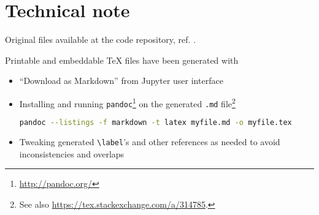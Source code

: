 \section*{Technical note}

Original files available at
the code repository, ref. \cite{OwnJupyterRepo}.

Printable and embeddable \TeX{} files have been generated with
\begin{itemize}
  \item
    ``Download as Markdown'' from Jupyter user interface
  \item
    Installing and running \verb#pandoc#\footnote{ \url{http://pandoc.org/}}
    on the generated \verb#.md# file\footnote{ See also \url{https://tex.stackexchange.com/a/314785}.}
    \begin{lstlisting}[language=Bash]
      pandoc --listings -f markdown -t latex myfile.md -o myfile.tex
    \end{lstlisting}
  \item
    Tweaking generated \verb#\label#'s and other references as needed to avoid inconsistencies and overlaps
\end{itemize}
